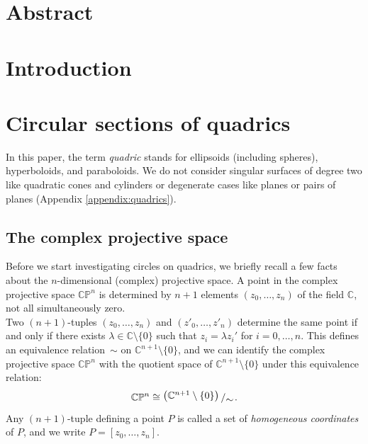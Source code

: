 \documentclass[12pt,a4paper]{article}
\newcommand{\bigslant}[2]{{\raisebox{.2em}{$#1$}\left/\raisebox{-.2em}{$#2$}\right.}}
\theoremstyle{BoldTopSpacing}
\theoremstyle{BoldTopSpacing}
\theoremstyle{BoldTopSpacing}
\theoremstyle{BoldTopBottomSpacing}
\theoremstyle{BoldTopSpacing}
\theoremstyle{BoldTopBottomSpacing}
\theoremstyle{remark}
\begin{document}
\pagestyle{fancy}
\section*{Abstract}
\label{sec:abstract}

\pagebreak
\pagestyle{tocstyle}
\renewcommand{\contentsname}{Contents}
\tableofcontents
\pagebreak
\listoffigures
\pagebreak
\pagestyle{fancy}
\section{Introduction}
\label{sec:introduction}
\pagebreak
\section{Circular sections of quadrics}
\label{sec:circular-sections-of-quadrics}

In this paper, the term \textit{quadric} stands for ellipsoids (including spheres), hyperboloids, and paraboloids. We do not consider singular surfaces of degree two like quadratic cones and cylinders or degenerate cases like planes or pairs of planes (Appendix \ref{appendix:quadrics}).

\subsection{The complex projective space}
\label{subsec:complex-projective-space}

Before we start investigating circles on quadrics, we briefly recall a few facts about the $n$-dimensional (complex) projective space. A point in the complex projective space $\mathbb{C}\mathbb{P}^{n}$ is determined by $n + 1$ elements $(z_{0}, \dots, z_{n})$ of the field $\mathbb{C}$, not all simultaneously zero. \\
Two $(n + 1)$-tuples $(z_{0}, \dots, z_{n})$ and $(z'_{0}, \dots, z'_{n})$ determine the same point if and only if there exists $\lambda \in \mathbb{C} \setminus \{ 0 \}$ such that $z_{i} = \lambda z_{i}'$ for $i = 0, \dots, n$. This defines an equivalence relation~$\sim$ on $\mathbb{C}^{n + 1} \setminus \{ 0 \}$, and we can identify the complex projective space $\mathbb{C}\mathbb{P}^n$ with the quotient space of $\mathbb{C}^{n + 1} \setminus \{ 0 \}$ under this equivalence relation:
\[
    \mathbb{C}\mathbb{P}^n \cong \bigslant{\left( \mathbb{C}^{n + 1} \setminus \{ 0 \} \right)}{\sim}.
\]
Any $(n+1)$-tuple defining a point $P$ is called a set of \textit{homogeneous coordinates} of $P$, and we write $P = [z_{0},\dots, z_{n}]$.\par
\end{document}
